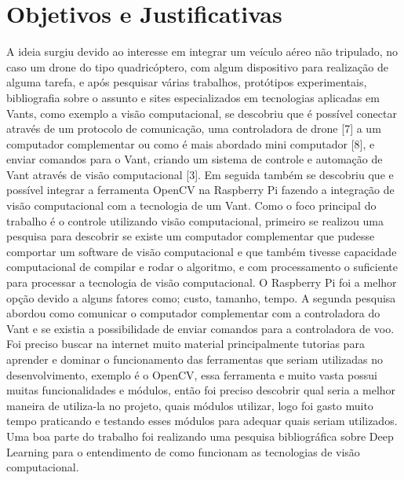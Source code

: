 \chapter{Objetivos e Justificativas}\label{cap:objJust}
A ideia surgiu devido ao interesse em integrar um veículo aéreo não tripulado, no caso um drone do tipo quadricóptero, com algum dispositivo para realização de alguma tarefa, e após pesquisar várias trabalhos, protótipos experimentais, bibliografia sobre o assunto e sites especializados em tecnologias aplicadas em Vants, como exemplo a visão computacional, se descobriu que é possível conectar através de um protocolo de comunicação, uma controladora de drone [7] a um computador complementar ou como é mais abordado mini computador [8], e enviar comandos para o Vant, criando um sistema de controle e automação de Vant através de visão computacional [3]. Em seguida também se descobriu que e possível integrar a ferramenta OpenCV na Raspberry Pi fazendo a integração de visão computacional com a tecnologia de um Vant.
Como o foco principal do trabalho é o controle utilizando visão computacional, primeiro se realizou uma pesquisa para descobrir se existe um computador complementar que pudesse comportar um software de visão computacional e que também tivesse capacidade computacional de compilar e rodar o algoritmo, e com processamento o suficiente para processar a tecnologia de visão computacional.
O Raspberry Pi foi a melhor opção devido a alguns fatores como; custo, tamanho, tempo.
A segunda pesquisa abordou como comunicar o computador complementar com a controladora do Vant e se existia a possibilidade de enviar comandos para a controladora de voo. 
Foi preciso buscar na internet muito material principalmente tutorias para aprender e dominar o funcionamento das ferramentas que seriam utilizadas no desenvolvimento, exemplo é o OpenCV, essa ferramenta e muito vasta possui muitas funcionalidades e módulos, então foi preciso descobrir qual seria a melhor maneira de utiliza-la no projeto, quais módulos utilizar, logo foi gasto muito tempo praticando e testando esses módulos para adequar quais seriam utilizados.  
Uma boa parte do trabalho foi realizando uma pesquisa bibliográfica sobre Deep Learning para o entendimento de como funcionam as tecnologias de visão computacional.
